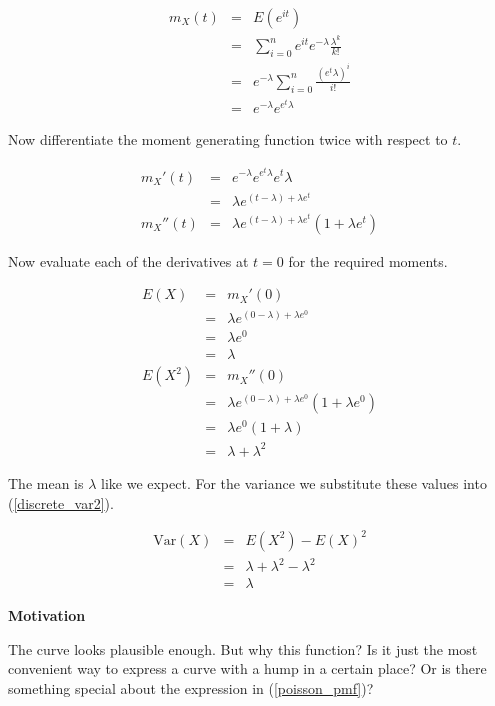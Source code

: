 \documentclass[]{article}
\begin{document}
\begin{eqnarray*}
m_X(t) & = & E(e^{it}) \\
   & = & \sum_{i=0}^n e^{it} e^{-\lambda} \frac{\lambda^k}{k!} \\
   & = & e^{-\lambda} \sum_{i=0}^n \frac{(e^t \lambda)^i}{i!} \\
   & = & e^{-\lambda} e^{e^t \lambda}
\end{eqnarray*}

Now differentiate the moment generating function twice with
respect to $t$.

\begin{eqnarray*}
m_X'(t) & = & e^{-\lambda} e^{e^t \lambda} e^t \lambda \\
        & = & \lambda e^{(t-\lambda) + \lambda e^t} \\
m_X''(t) & = & \lambda e^{(t-\lambda) + \lambda e^t}(1+\lambda e^t)\end{eqnarray*}

Now evaluate each of the derivatives at $t=0$ for the
required moments.

\begin{eqnarray*}
E(X) & = & m_X'(0) \\
   & = & \lambda e^{(0-\lambda) + \lambda e^0} \\
   & = & \lambda e^0 \\
   & = & \lambda \label{poisson_mean} \\
E(X^2) & = & m_X''(0) \\
   & = & \lambda e^{(0-\lambda) + \lambda e^0}(1+\lambda e^0) \\
   & = & \lambda e^0(1+\lambda) \\
   & = & \lambda + \lambda^2
\end{eqnarray*}

The mean is $\lambda$ like we expect.  For the variance we
substitute these values into (\ref{discrete_var2}).

\begin{eqnarray}
\mbox{Var}(X) & = & E(X^2) - E(X)^2 \nonumber \\
   & = & \lambda + \lambda^2 - \lambda^2 \nonumber \\
   & = & \lambda \label{poisson_var}
\end{eqnarray}

\textbf{Motivation}

The curve looks plausible
enough.  But why this function?  Is it just the most
convenient way to express a curve with a hump in a certain
place?  Or is there something special about the expression
in (\ref{poisson_pmf})?
\end{document}
